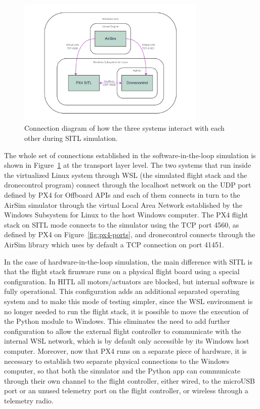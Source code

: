 \begin{figure}
  \centering
  \includegraphics[width=0.8\textwidth,keepaspectratio]{img/sitl-connections.jpg}
  \caption{Connection diagram of how the three systems interact with each other during SITL simulation.}\label{fig:sitl-connections}
\end{figure}
The whole set of connections established in the software-in-the-loop simulation is shown in Figure~\ref{fig:sitl-connections} at the transport layer level. The two systems that run inside the virtualized Linux system through WSL (the simulated flight stack and the dronecontrol program) connect through the localhost network on the UDP port defined by PX4 for Offboard APIs and each of them connects in turn to the AirSim simulator through the virtual Local Area Network established by the Windows Subsystem for Linux to the host Windows computer.
The PX4 flight stack on SITL mode connects to the simulator using the TCP port 4560, as defined by PX4 on Figure~\ref{fig:px4-ports}, and dronecontrol connects through the AirSim library which uses by default a TCP connection on port 41451.

In the case of hardware-in-the-loop simulation, the main difference with SITL is that the flight stack firmware runs on a physical flight board using a special configuration.
In HITL all motors/actuators are blocked, but internal software is fully operational.
This configuration adds an additional separated operating system and to make this mode of testing simpler, since the WSL environment is no longer needed to run the flight stack, it is possible to move the execution of the Python module to Windows.
This eliminates the need to add further configuration to allow the external flight controller to communicate with the internal WSL network, which is by default only accessible by its Windows host computer.
Moreover, now that PX4 runs on a separate piece of hardware, it is necessary to establish two separate physical connections to the Windows computer, so that both the simulator and the Python app can communicate through their own channel to the flight controller, either wired, to the microUSB port or an unused telemetry port on the flight controller, or wireless through a telemetry radio.

